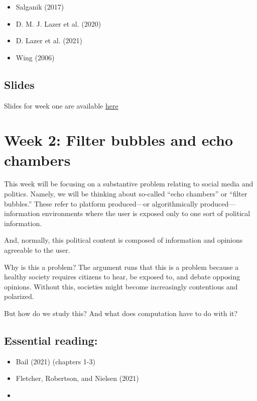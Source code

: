\documentclass[
  letterpaper,
  DIV=11,
  numbers=noendperiod]{scrreprt}
\begin{document}
\begin{itemize}
\item
  Salganik (2017)
\item
  D. M. J. Lazer et al. (2020)
\item
  D. Lazer et al. (2021)
\item
  Wing (2006)
\end{itemize}

\hypertarget{slides}{%
\section{Slides}\label{slides}}

Slides for week one are available
\href{https://raw.githack.com/cjbarrie/CS-ED/main/slides/000_intro.html}{here}


\hypertarget{week-2-filter-bubbles-and-echo-chambers}{%
\chapter{Week 2: Filter bubbles and echo
chambers}\label{week-2-filter-bubbles-and-echo-chambers}}

This week will be focusing on a substantive problem relating to social
media and politics. Namely, we will be thinking about so-called ``echo
chambers'' or ``filter bubbles.'' These refer to platform produced---or
algorithmically produced---information environments where the user is
exposed only to one sort of political information.

And, normally, this political content is composed of information and
opinions agreeable to the user.

Why is this a problem? The argument runs that this is a problem because
a healthy society requires citizens to hear, be exposed to, and debate
opposing opinions. Without this, societies might become increasingly
contentious and polarized.

But how do we study this? And what does computation have to do with it?

\hypertarget{essential-reading-1}{%
\section{Essential reading:}\label{essential-reading-1}}

\begin{itemize}
\item
  Bail (2021) (chapters 1-3)
\item
  Fletcher, Robertson, and Nielsen (2021)
\item
\end{itemize}
\end{document}
